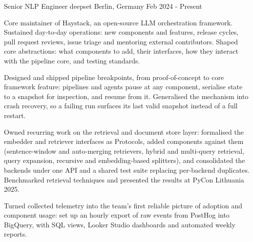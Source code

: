 

\begin{cventries}
  \cventry
    {Senior NLP Engineer} %
    {deepset} %
    {Berlin, Germany} %
    {Feb 2024 - Present} %
	{
      \begin{cvitems} %
%
		\item {Core maintainer of Haystack, an open-source LLM orchestration framework. Sustained day-to-day operations: new components and features, release cycles, pull request reviews, issue triage and mentoring external contributors. Shaped core abstractions: what components to add, their interfaces, how they interact with the pipeline core, and testing standards.}
%
		\item {Designed and shipped pipeline breakpoints, from proof-of-concept to core framework feature: pipelines and agents pause at any component, serialise state to a snapshot for inspection, and resume from it. Generalised the mechanism into crash recovery, so a failing run surfaces its last valid snapshot instead of a full restart.}
%
		\item {Owned recurring work on the retrieval and document store layer: formalised the embedder and retriever interfaces as Protocols, added components against them (sentence-window and auto-merging retrievers, hybrid and multi-query retrieval, query expansion, recursive and embedding-based splitters), and consolidated the backends under one API and a shared test suite replacing per-backend duplicates. Benchmarked retrieval techniques and presented the results at PyCon Lithuania 2025.}
%
		\item {Turned collected telemetry into the team's first reliable picture of adoption and component usage: set up an hourly export of raw events from PostHog into BigQuery, with SQL views, Looker Studio dashboards and automated weekly reports.}

\end{cvitems}}
\end{cventries}
